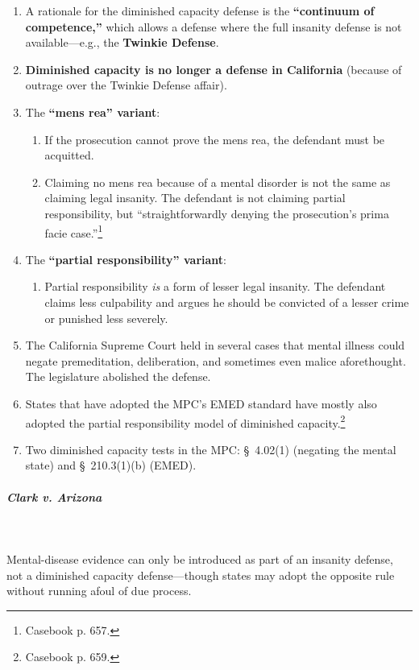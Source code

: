 \begin{enumerate}
    \item A rationale for the diminished capacity defense is the 
    \textbf{``continuum of competence,''} which allows a defense where the 
    full insanity defense is not available---e.g., the \textbf{Twinkie 
    Defense}.
    \item \textbf{Diminished capacity is no longer a defense in California} 
    (because of outrage over the Twinkie Defense affair).
    \item The \textbf{``mens rea'' variant}:
    \begin{enumerate}
        \item If the prosecution cannot prove the mens rea, the defendant must 
        be acquitted.
        \item Claiming no mens rea because of a mental disorder is not the 
        same as claiming legal insanity. The defendant is not claiming partial 
        responsibility, but ``straightforwardly denying the prosecution's 
        prima facie case.''\footnote{Casebook p. 657.}
    \end{enumerate}
    \item The \textbf{``partial responsibility'' variant}:
    \begin{enumerate}
        \item Partial responsibility \emph{is} a form of lesser legal 
        insanity. The defendant claims less culpability and argues he should 
        be convicted of a lesser crime or punished less severely.
    \end{enumerate}
    \item The California Supreme Court held in several cases that mental 
    illness could negate premeditation, deliberation, and sometimes even 
    malice aforethought. The legislature abolished the defense.
    \item States that have adopted the MPC's EMED standard have mostly also 
    adopted the partial responsibility model of diminished 
    capacity.\footnote{Casebook p. 659.}
    \item Two diminished capacity tests in the MPC: \S\ 4.02(1) (negating the 
    mental state) and \S\ 210.3(1)(b) (EMED).
\end{enumerate}

\paragraph{\emph{Clark v. Arizona}}
~\\\\
Mental-disease evidence can only be introduced as part of an insanity defense, 
not a diminished capacity defense---though states may adopt the opposite rule 
without running afoul of due process.

